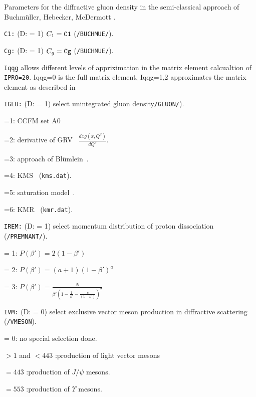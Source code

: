 \documentclass[10pt]{article} \usepackage{dina4}
\newcommand{\deflab}[1]{#1\hfil}%
\newenvironment{defl}[1]%
  {\begin{list}{}{\settowidth{\labelwidth}{#1}%
  \setlength{\leftmargin}{\labelwidth}%
  \addtolength{\leftmargin}{\labelsep}%
  \setlength{\itemsep}{0pt plus 1pt}
  \setlength{\parsep}{0pt plus 1pt}
  \setlength{\topsep}{0pt plus 1pt}
  \setlength{\partopsep}{0pt plus 1pt}
  \setlength{\parskip}{2mm plus 1mm minus 1mm}
  \let\makelabel\deflab}}%
  {\end{list}}
\begin{document}
\begin{defl}{123456789012345}
\item[ ] Parameters for the diffractive
                           gluon density in the semi-classical approach of
                            Buchm\"uller, Hebecker, McDermott
                              \cite{Buchmuller_Hebecker_Mcdermott}.
\item[{\tt C1:}] (D: = 1) $C_1=\verb+C1+$ (\verb+/BUCHMUE/+).
\item[{\tt Cg:}] (D: = 1) $C_g=\verb+Cg+$ (\verb+/BUCHMUE/+).

\item[{\tt Iqqg}]  allows different levels of appriximation in the
matrix element calcualtion of \verb+IPRO=20+. Iqqg=0 is the full matrix element,
Iqqg=1,2 approximates the matrix element as described in \cite{Bartels_qqga}

\item[{\tt IGLU:}]  (D: = 1)
			select unintegrated gluon density{\tt /GLUON/}).
\item[]
                        =1: CCFM set A0 \cite{jung-dis04}
\item[]
                        =2:  derivative of GRV~\cite{GRV95}
				$\frac{d xg(x,Q^2)}{dQ^2}$.
\item[]
                        =3:  approach of Bl\"umlein~\cite{Bluemlein}.
\item[]
                        =4:  KMS~\cite{martin_stasto} (\verb+kms.dat+).
\item[]
                        =5:  saturation model~\cite{wuesthoff_golec-biernat}.
\item[]
                        =6:  KMR~\cite{martin_kimber} (\verb+kmr.dat+).




\item[{\tt IREM:}] (D: = 1) 
                     select momentum distribution of proton
                             dissociation (\verb+/PREMNANT/+).
\item[     ] = 1: $P(\beta')  =  2 (1 - \beta') $
\item[     ] = 2: $P(\beta')  =   (a+1) (1 - \beta')^a $
\item[     ] = 3: $P(\beta')  =  
           \frac{N}{ \beta'\left(1 - \frac{1}{\beta'} - 
           \frac{c}{(1 - \beta')}\right) ^2}$

\item[{\tt IVM:}] (D: = 0) select exclusive vector
meson production in diffractive scattering (\verb+/VMESON+).
\item[] = 0: no special selection done.
\item[] $>1$ and $< 443$ :production of light vector mesons
\item[] $= 443$ :production of $J/\psi$ mesons.
\item[] $= 553$ :production of $\Upsilon$ mesons.



\end{defl}
\end{document}
